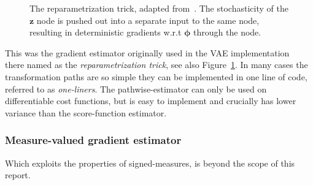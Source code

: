 \begin{figure}
	\centering
	\caption[The reparametrization trick]{The reparametrization trick, adapted from~\cite{kingma2017variational}. The stochasticity of the $\mathbf{z}$ node is pushed out into a separate input to the same node, resulting in deterministic gradients w.r.t $\boldsymbol{\phi}$ through the node.}
	\label{fig:reparam}
\end{figure}
This was the gradient estimator originally used in the VAE implementation~\cite{kingma2013auto} there named as the \emph{reparametrization trick}, see also Figure~\ref{fig:reparam}. In many cases the transformation paths are so simple they can be implemented in one line of code, referred to as \emph{one-liners}. The pathwise-estimator can only be used on differentiable cost functions, but is easy to implement and crucially has lower variance than the score-function estimator.

\subsubsection{Measure-valued gradient estimator}
Which exploits the properties of signed-measures, is beyond the scope of this report.	

